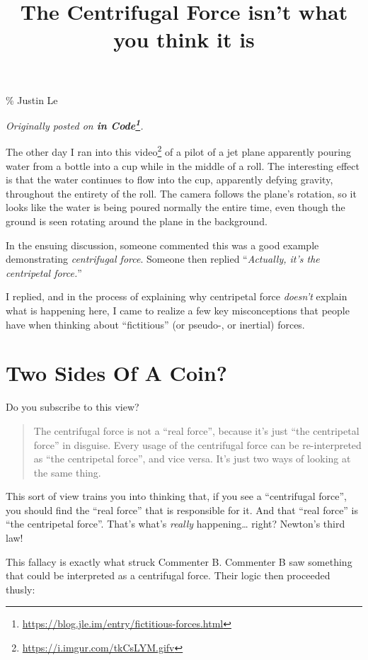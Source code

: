 \documentclass[]{article}
\title{The Centrifugal Force isn't what you think it is}
\renewcommand{\href}[2]{#2\footnote{\url{#1}}}
\begin{document}
\maketitle

\% Justin Le

\emph{Originally posted on
\textbf{\href{https://blog.jle.im/entry/fictitious-forces.html}{in Code}}.}

The other day I ran into \href{https://i.imgur.com/tkCsLYM.gifv}{this video} of
a pilot of a jet plane apparently pouring water from a bottle into a cup while
in the middle of a roll. The interesting effect is that the water continues to
flow into the cup, apparently defying gravity, throughout the entirety of the
roll. The camera follows the plane's rotation, so it looks like the water is
being poured normally the entire time, even though the ground is seen rotating
around the plane in the background.

In the ensuing discussion, someone commented this was a good example
demonstrating \emph{centrifugal force}. Someone then replied ``\emph{Actually,
it's the centripetal force.}''

I replied, and in the process of explaining why centripetal force \emph{doesn't}
explain what is happening here, I came to realize a few key misconceptions that
people have when thinking about ``fictitious'' (or pseudo-, or inertial) forces.

\section{Two Sides Of A Coin?}\label{two-sides-of-a-coin}

Do you subscribe to this view?

\begin{quote}
The centrifugal force is not a ``real force'', because it's just ``the
centripetal force'' in disguise. Every usage of the centrifugal force can be
re-interpreted as ``the centripetal force'', and vice versa. It's just two ways
of looking at the same thing.
\end{quote}

This sort of view trains you into thinking that, if you see a ``centrifugal
force'', you should find the ``real force'' that is responsible for it. And that
``real force'' is ``the centripetal force''. That's what's \emph{really}
happening\ldots{} right? Newton's third law!

This fallacy is exactly what struck Commenter B. Commenter B saw something that
could be interpreted as a centrifugal force. Their logic then proceeded thusly:
\end{document}
